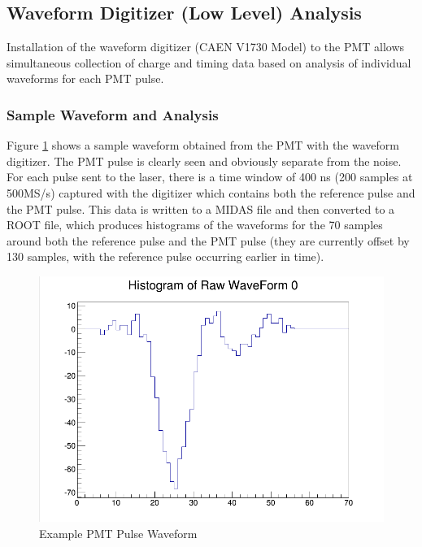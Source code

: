\documentclass[twoside,letterpaper]{refart}
\begin{document}
\clearpage

\subsection{Waveform Digitizer (Low Level) Analysis}



Installation of the waveform digitizer (CAEN V1730 Model) to the PMT allows simultaneous collection of charge and timing data based on analysis of individual waveforms for each PMT pulse. 

\subsubsection{Sample Waveform and Analysis} \label{waveformAnalysis}

Figure \ref{sampleWav} shows a sample waveform obtained from the PMT with the waveform digitizer.  The PMT pulse is clearly seen and obviously separate from the noise. For each pulse sent to the laser, there is a time window of 400 ns (200 samples at 500MS/s) captured with the digitizer which contains both the reference pulse and the PMT pulse.  This data is written to a MIDAS file and then converted to a ROOT file, which produces histograms of the waveforms for the 70 samples around both the reference pulse and the PMT pulse (they are currently offset by 130 samples, with the reference pulse occurring earlier in time).

\FloatBarrier

\begin{figure}[!htpb] 
	\centering	
	\includegraphics[scale=0.3]{images/sampleWav.png}
	\caption{Example PMT Pulse Waveform}
	\label{sampleWav}
\end{figure}
\end{document}
